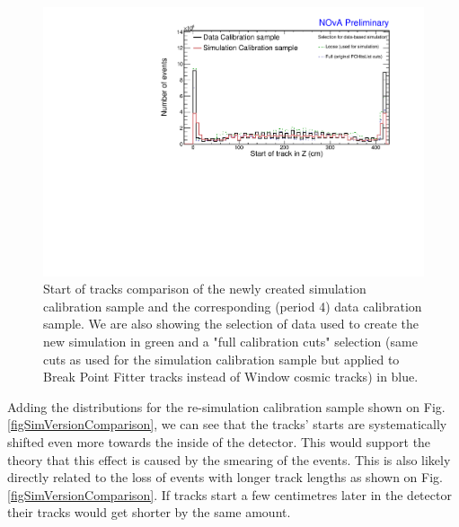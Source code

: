 \documentclass[12pt]{article}
\begin{document}
\begin{figure}[!ht]
\includegraphics[clip, width=\textwidth]{DataMCComparison_StartZ.pdf}
\caption{Start of tracks comparison of the newly created simulation calibration sample and the corresponding (period 4) data calibration sample. We are also showing the selection of data used to create the new simulation in green and a "full calibration cuts" selection (same cuts as used for the simulation calibration sample but applied to Break Point Fitter tracks instead of Window cosmic tracks) in blue.}
\label{figDataMCComparison_startZ}
\end{figure}

Adding the distributions for the re-simulation calibration sample shown on Fig. \ref{figSimVersionComparison}, we can see that the tracks' starts are systematically shifted even more towards the inside of the detector. This would support the theory that this effect is caused by the smearing of the events. This is also likely directly related to the loss of events with longer track lengths as shown on Fig. \ref{figSimVersionComparison}. If tracks start a few centimetres later in the detector their tracks would get shorter by the same amount.
\end{document}
